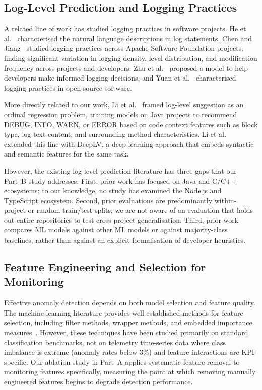 \documentclass[10pt,twocolumn]{article}
\begin{document}
\subsection{Log-Level Prediction and Logging Practices}

A related line of work has studied logging practices in software projects. He et al.~\cite{he2018} characterised the natural language descriptions in log statements. Chen and Jiang~\cite{chen2017} studied logging practices across Apache Software Foundation projects, finding significant variation in logging density, level distribution, and modification frequency across projects and developers. Zhu et al.~\cite{zhu2015} proposed a model to help developers make informed logging decisions, and Yuan et al.~\cite{yuan2012} characterised logging practices in open-source software.

More directly related to our work, Li et al.~\cite{li2017} framed log-level suggestion as an ordinal regression problem, training models on Java projects to recommend DEBUG, INFO, WARN, or ERROR based on code context features such as block type, log text content, and surrounding method characteristics. Li et al.~\cite{li2021} extended this line with DeepLV, a deep-learning approach that embeds syntactic and semantic features for the same task.

However, the existing log-level prediction literature has three gaps that our Part~B study addresses. First, prior work has focused on Java and C/C++ ecosystems; to our knowledge, no study has examined the Node.js and TypeScript ecosystem. Second, prior evaluations are predominantly within-project or random train/test splits; we are not aware of an evaluation that holds out entire repositories to test cross-project generalisation. Third, prior work compares ML models against other ML models or against majority-class baselines, rather than against an explicit formalisation of developer heuristics.

\subsection{Feature Engineering and Selection for Monitoring}

Effective anomaly detection depends on both model selection and feature quality. The machine learning literature provides well-established methods for feature selection, including filter methods, wrapper methods, and embedded importance measures~\cite{guyon2003}. However, these techniques have been studied primarily on standard classification benchmarks, not on telemetry time-series data where class imbalance is extreme (anomaly rates below 3\%) and feature interactions are KPI-specific. Our ablation study in Part~A applies systematic feature removal to monitoring features specifically, measuring the point at which removing manually engineered features begins to degrade detection performance.
\end{document}
